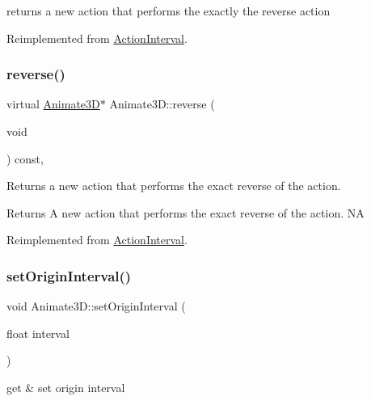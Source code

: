 returns a new action that performs the exactly the reverse action 

Reimplemented from \hyperlink{classActionInterval_a9f9ac7164036a0bc261a72f62a2b2da7}{Action\+Interval}.

\mbox{\label{classAnimate3D_a54f554bc2790e7c405716c291e00daf7}} 
\subsubsection{\texorpdfstring{reverse()}{reverse()}\hspace{0.1cm}{\footnotesize\ttfamily [2/2]}}
{\footnotesize\ttfamily virtual \hyperlink{classAnimate3D}{Animate3D}$\ast$ Animate3\+D\+::reverse (\begin{DoxyParamCaption}\item[{void}]{ }\end{DoxyParamCaption}) const\hspace{0.3cm}{\ttfamily [override]}, {\ttfamily [virtual]}}

Returns a new action that performs the exact reverse of the action.

\begin{DoxyReturn}{Returns}
A new action that performs the exact reverse of the action.  NA 
\end{DoxyReturn}


Reimplemented from \hyperlink{classActionInterval_a9f9ac7164036a0bc261a72f62a2b2da7}{Action\+Interval}.

\mbox{\label{classAnimate3D_a1b01bd49f7aaa50586f21d41137555c2}} 
\subsubsection{\texorpdfstring{set\+Origin\+Interval()}{setOriginInterval()}\hspace{0.1cm}{\footnotesize\ttfamily [1/2]}}
{\footnotesize\ttfamily void Animate3\+D\+::set\+Origin\+Interval (\begin{DoxyParamCaption}\item[{float}]{interval }\end{DoxyParamCaption})}

get \& set origin interval \mbox{\label{classAnimate3D_a1b01bd49f7aaa50586f21d41137555c2}} 
